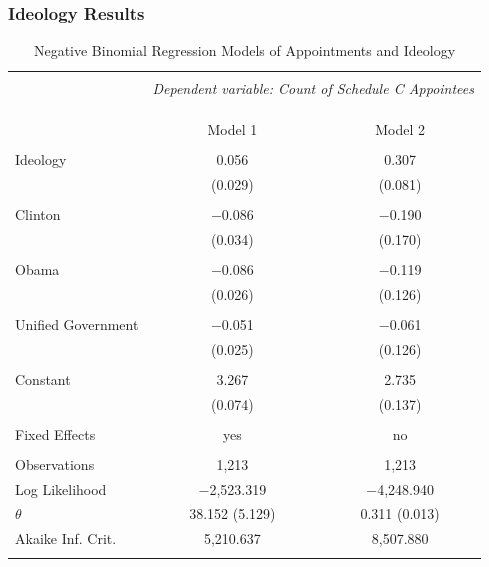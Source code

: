 \documentclass{beamer}
\begin{document}
\begin{frame}[fragile]
\frametitle{Ideology Results}
\tiny
\begin{table}[!h] \centering 
  \caption{Negative Binomial Regression Models of Appointments and Ideology} 
  \label{} 
\begin{tabular}{@{\extracolsep{5pt}}lcc} 
\\[-1.8ex]\hline 
\hline \\[-1.8ex] 
 & \multicolumn{2}{c}{\textit{Dependent variable: Count of Schedule C Appointees}} \\ 
\cline{2-3} 
\\[-1.8ex] & \multicolumn{2}{c}{} \\ 
\\[-1.8ex] & Model 1 & Model 2\\ 
\hline \\[-1.8ex] 
 Ideology & 0.056 & 0.307 \\ 
  & (0.029) & (0.081) \\ 
  & & \\ 
 Clinton & $-$0.086 & $-$0.190 \\ 
  & (0.034) & (0.170) \\ 
  & & \\ 
 Obama & $-$0.086 & $-$0.119 \\ 
  & (0.026) & (0.126) \\ 
  & & \\ 
 Unified Government & $-$0.051 & $-$0.061 \\ 
  & (0.025) & (0.126) \\ 
  & & \\ 
 Constant & 3.267 & 2.735 \\ 
  & (0.074) & (0.137) \\ 
  & & \\ 
  Fixed Effects & yes & no\\
\hline \\[-1.8ex] 
Observations & 1,213 & 1,213 \\ 
Log Likelihood & $-$2,523.319 & $-$4,248.940 \\ 
$\theta$ & 38.152  (5.129) & 0.311  (0.013) \\ 
Akaike Inf. Crit. & 5,210.637 & 8,507.880 \\ 
\hline 
\hline \\[-1.8ex] 
\end{tabular}
\end{table} 
\end{frame}
\end{document}
